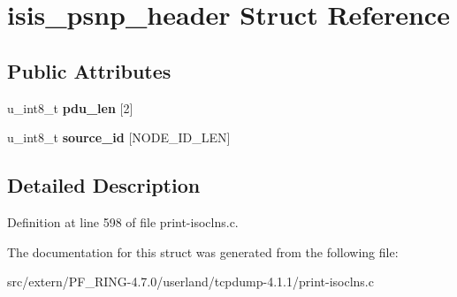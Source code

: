 \hypertarget{structisis__psnp__header}{
\section{isis\_\-psnp\_\-header Struct Reference}
\label{structisis__psnp__header}
}
\subsection*{Public Attributes}
\begin{DoxyCompactItemize}
\item 
\hypertarget{structisis__psnp__header_af433a0459f20eb1f68d7846e8c4f75c8}{
u\_\-int8\_\-t {\bfseries pdu\_\-len} \mbox{[}2\mbox{]}}
\label{structisis__psnp__header_af433a0459f20eb1f68d7846e8c4f75c8}

\item 
\hypertarget{structisis__psnp__header_a1b5857cb0cadd762792e5fe20470936c}{
u\_\-int8\_\-t {\bfseries source\_\-id} \mbox{[}NODE\_\-ID\_\-LEN\mbox{]}}
\label{structisis__psnp__header_a1b5857cb0cadd762792e5fe20470936c}

\end{DoxyCompactItemize}


\subsection{Detailed Description}


Definition at line 598 of file print-\/isoclns.c.



The documentation for this struct was generated from the following file:\begin{DoxyCompactItemize}
\item 
src/extern/PF\_\-RING-\/4.7.0/userland/tcpdump-\/4.1.1/print-\/isoclns.c\end{DoxyCompactItemize}
